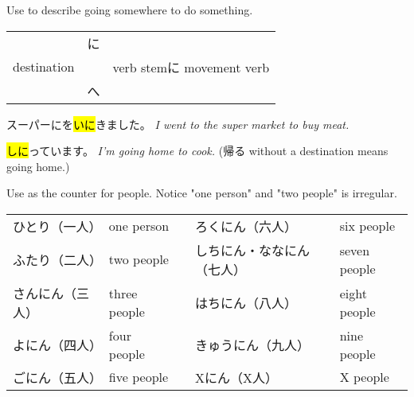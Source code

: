     {
    Use to describe going somewhere to do something.

    \begin{tabular}{|ccc|}
        \hline
                    & に & \\
        destination &    & verb stemに movement verb \\
                    & へ & \\
        \hline
    \end{tabular}

    スーパーにを\hl{いに}きました。
    \textit{I went to the super market to buy meat.}

    \hl{しに}っています。
    \textit{I'm going home to cook.} (帰る without a destination means going home.)
    }

    {
    Use  as the counter for people. Notice "one person" and "two people" is irregular.
    
    \begin{tabular}{|llcll|}
        \hline
        ひとり（一人）  & one person   & \hspace{5mm} & ろくにん（六人）          & six people \\
        ふたり（二人）  & two people   &              & しちにん・ななにん（七人）& seven people \\
        さんにん（三人）& three people &              & はちにん（八人）          & eight people \\
        よにん（四人）  & four people  &              & きゅうにん（九人）        & nine people \\
        ごにん（五人）  & five people  &              & Xにん（X人）              & X people \\
        \hline
    \end{tabular}
    }
